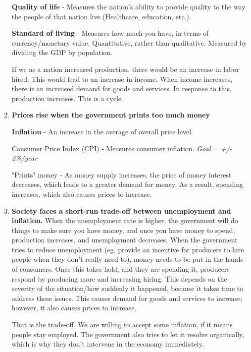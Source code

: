\documentclass{article}
\begin{document}
\begin{enumerate}
{    \textbf{Quality of life} - Measures the nation's ability to provide quality to the way the people of that nation live (Healthcare, education, etc.).

    \textbf{Standard of living} - Measures how much you have, in terms of currency/monetary value. Quantitative, rather than qualitative. Measured by dividing the GDP by population.

    If we as a nation increased production, there would be an increase in labor hired. This would lead to an increase in income. When income increases, there is an increased demand for goods and services. In response to this, production increases. This is a cycle.}

    \item{\textbf{Prices rise when the government prints too much money}

    \textbf{Inflation} - An increase in the average of overall price level.}

    Consumer Price Index (CPI) - Measures consumer inflation. \textit{Goal = +/- 2\%/year}

    "Prints" money - As money supply increases, the price of money interest decreases, which leads to a greater demand for money. As a result, spending increases, which also causes prices to increase.

    \item{\textbf{Society faces a short-run trade-off between unemployment and inflation.} When the unemployment rate is higher, the government will do things to make sure you have money, and once you have money to spend, production increases, and unemployment decreases. When the government tries to reduce unemployment (eg. provide an incentive for producers to hire people when they don't really need to), money needs to be put in the hands of consumers. Once this takes hold, and they are spending it, producers respond by producing more and increasing hiring. This depends on the severity of the situation/how suddenly it happened, because it takes time to address these issues. This causes demand for goods and services to increase; however, it also causes prices to increase. 
    
    That is the trade-off. We are willing to accept some inflation, if it means people stay employed. The government also tries to let it resolve organically, which is why they don't intervene in the economy immediately.}
    
\end{enumerate}
\end{document}
